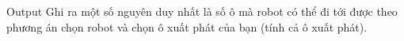 Output
Ghi ra một số nguyên duy nhất là số ô mà robot có thể đi tới được theo phương án chọn robot và chọn ô xuất phát của bạn (tính cả ô xuất phát).